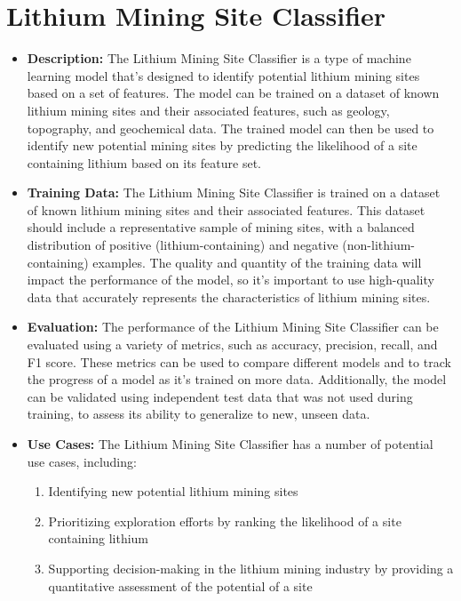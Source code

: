 \section{Lithium Mining Site Classifier}

\begin{itemize} 
    \item \textbf{Description:} The Lithium Mining Site Classifier is a type of machine learning model that's designed to identify potential lithium mining sites based on a set of features. The model can be trained on a dataset of known lithium mining sites and their associated features, such as geology, topography, and geochemical data. The trained model can then be used to identify new potential mining sites by predicting the likelihood of a site containing lithium based on its feature set.
    \item \textbf{Training Data:} The Lithium Mining Site Classifier is trained on a dataset of known lithium mining sites and their associated features. This dataset should include a representative sample of mining sites, with a balanced distribution of positive (lithium-containing) and negative (non-lithium-containing) examples. The quality and quantity of the training data will impact the performance of the model, so it's important to use high-quality data that accurately represents the characteristics of lithium mining sites.
    \item \textbf{Evaluation:} The performance of the Lithium Mining Site Classifier can be evaluated using a variety of metrics, such as accuracy, precision, recall, and F1 score. These metrics can be used to compare different models and to track the progress of a model as it's trained on more data. Additionally, the model can be validated using independent test data that was not used during training, to assess its ability to generalize to new, unseen data.
    \item \textbf{Use Cases:} The Lithium Mining Site Classifier has a number of potential use cases, including:
    \begin{enumerate}
        \item Identifying new potential lithium mining sites
        \item Prioritizing exploration efforts by ranking the likelihood of a site containing lithium
        \item Supporting decision-making in the lithium mining industry by providing a quantitative assessment of the potential of a site
    \end{enumerate}

\end{itemize}
